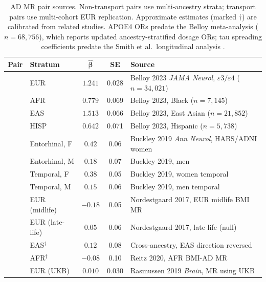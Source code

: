 \documentclass{article}
\begin{document}
\begin{table}[h]
\centering
\caption{AD MR pair sources. Non-transport pairs use multi-ancestry strata; transport pairs use multi-cohort EUR replication. Approximate estimates (marked $\dagger$) are calibrated from related studies. APOE4 ORs predate the Belloy meta-analysis \citep{belloy2023apoe} ($n = 68{,}756$), which reports updated ancestry-stratified dosage ORs; tau spreading coefficients predate the Smith et al.\ longitudinal analysis \citep{smith2020tau}.}
\label{tab:mr-sources-ad}
\small
\begin{tabular}{@{}llccp{4.5cm}@{}}
\toprule
\textbf{Pair} & \textbf{Stratum} & $\boldsymbol{\hat\beta}$ & \textbf{SE} & \textbf{Source} \\
\midrule
{}
& EUR & $1.241$ & 0.028 & Belloy 2023 \emph{JAMA Neurol}, $\varepsilon3/\varepsilon4$ ($n = 34{,}021$) \\
& AFR & $0.779$ & 0.069 & Belloy 2023, Black ($n = 7{,}145$) \\
& EAS & $1.513$ & 0.066 & Belloy 2023, East Asian ($n = 21{,}852$) \\
& HISP & $0.642$ & 0.071 & Belloy 2023, Hispanic ($n = 5{,}738$) \\
\midrule
{}
& Entorhinal, F & $0.42$ & 0.06 & Buckley 2019 \emph{Ann Neurol}, HABS/ADNI women \\
& Entorhinal, M & $0.18$ & 0.07 & Buckley 2019, men \\
& Temporal, F & $0.38$ & 0.05 & Buckley 2019, women temporal \\
& Temporal, M & $0.15$ & 0.06 & Buckley 2019, men temporal \\
\midrule
{}
& EUR (midlife) & $-0.18$ & 0.05 & Nordestgaard 2017, EUR midlife BMI MR \\
& EUR (late-life) & $0.05$ & 0.06 & Nordestgaard 2017, late-life (null) \\
& EAS$^\dagger$ & $0.12$ & 0.08 & Cross-ancestry, EAS direction reversed \\
& AFR$^\dagger$ & $-0.08$ & 0.10 & Reitz 2020, AFR BMI-AD MR \\
\midrule
{}
& EUR (UKB) & $0.010$ & 0.030 & Rasmussen 2019 \emph{Brain}, MR using UKB \\

\end{tabular}
\end{table}
\end{document}
